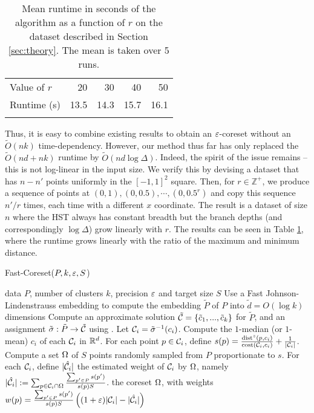 \begin{table}[htbp]
    \centering
    \begin{tabular}{lrrrr}
        \hline
        Value of $r$ & 20 & 30 & 40 & 50 \\
        Runtime (s) & 13.5 & 14.3 & 15.7 & 16.1 \\
        \hline
        \vspace*{0.1cm}
    \end{tabular}
    \caption{Mean runtime in seconds of the \fkmeans algorithm as a function of $r$ on the dataset described in Section \ref{sec:theory}. The mean is taken over
    5 runs.}
    \label{tbl:logdelta}
\end{table}

Thus, it is easy to combine existing results to obtain an $\varepsilon$-coreset without an $\tilde{O}(nk)$ time-dependency.  However, our method thus far has only
replaced the $\tilde{O}(nd + nk)$ runtime by $\tilde{O}(nd \log \Delta)$. Indeed, the spirit of the issue remains -- this is not log-linear in the input size.  We
verify this by devising a dataset that has $n - n'$ points uniformly in the $[-1, 1]^2$ square. Then, for $r \in \mathbb{Z}^+$, we produce a sequence of points
at $(0, 1), (0, 0.5), \cdots, (0, 0.5^r)$ and copy this sequence $n' / r$ times, each time with a different $x$ coordinate. The result is a dataset of size $n$
where the HST always has constant breadth but the branch depths (and correspondingly $\log \Delta$) grow linearly with $r$. The results can be seen in Table
\ref{tbl:logdelta}, where the runtime grows linearly with the ratio of the maximum and minimum distance.

\begin{algorithm}[tb]
   \caption{Fast-Coreset($P, k, \varepsilon, S$)}
   \label{alg:main}
\begin{algorithmic}[1]
    data $P$, number of clusters $k$, precision $\varepsilon$ and target size $S$
   \State Use a Fast Johnson-Lindenstrauss  embedding to compute the embedding $\tilde P$ of $P$ into $\tilde d = O(\log k)$ dimensions
   \State Compute an approximate solution $\tilde {\mathcal C} = \left\{ \tilde c_1, ..., \tilde c_k\right\} $ for $\tilde P$, and an assignment $\tilde \sigma : \tilde P \rightarrow \tilde {\mathcal C}$ using \fkmeans.	
   \State Let $\mathcal C_i = \tilde \sigma^{-1}(c_i)$. Compute the $1$-median (or $1$-mean) $c_i$ of each $\mathcal C_i$ in $\mathbb{R}^d$.%
   \State For each point $p \in \mathcal C_i$, define
   $s(p) = \frac{\operatorname{dist}^z(p, c_i)}{\operatorname{cost}(\mathcal C_i, c_i)}+ \frac{1}{|\mathcal C_i|}$.
   \State Compute a set $\Omega$ of $S$ points randomly sampled from $P$ proportionate to $s$.
   \State For each $\mathcal C_i$, define $|\hat {\mathcal C}_i|$ the estimated weight of $\mathcal C_i$ by $\Omega$, namely $|\hat {\mathcal C}_i| := \sum_{p \in \mathcal C_i \cap \Omega} \frac{\sum_{p' \in P}s(p')}{s(p)S}$.
    the coreset $\Omega$, with weights $w(p) = \frac{\sum_{p' \in P}s(p')}{s(p)S} \left( (1+\varepsilon)|\mathcal C_i| - |\hat {\mathcal C}_i|\right)$
\end{algorithmic}
\end{algorithm}

